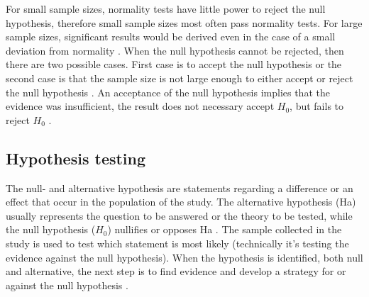 For small sample sizes, normality tests have little power to reject the null hypothesis, therefore small sample sizes most often pass normality tests. For large sample sizes, significant results would be derived even in the case of a small deviation from normality \citep{Pearson2006}. When the null hypothesis cannot be rejected, then there are two possible cases. First case is to accept the null hypothesis or the second case is that the sample size is not large enough to either accept or reject the null hypothesis \citep{ThePennsylvaniaStateUniversity2017}. An acceptance of the null hypothesis implies that the evidence was insufficient, the result does not necessary accept $H_{0}$, but fails to reject $H_{0}$ \citep{Walpole2012}.  





\subsection{Hypothesis testing}\label{sec:hypothesistesting}
The null- and alternative hypothesis are statements regarding a difference or an effect that occur in the population of the study. The alternative hypothesis (Ha) usually represents the question to be answered or the theory to be tested, while the null hypothesis ($H_{0}$) nullifies or opposes Ha \citep{Walpole2012}. The sample collected in the study is used to test which statement is most likely (technically it's testing the evidence against the null hypothesis).  When the hypothesis is identified, both null and alternative, the next step is to find evidence and develop a strategy for or against the null hypothesis \citep{LundResearchLtd2013}.

